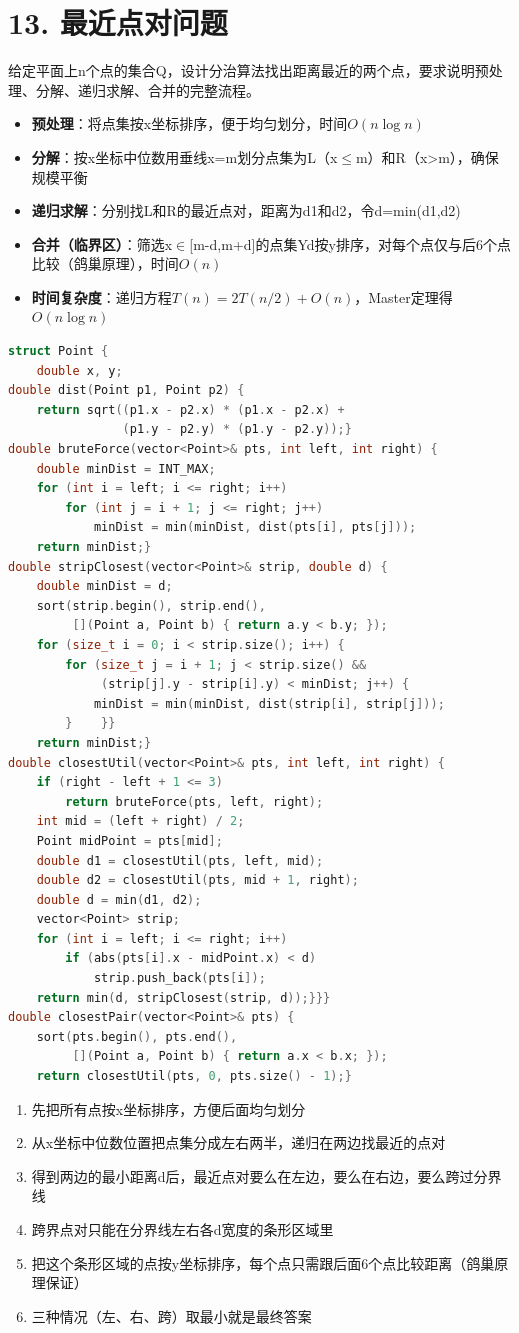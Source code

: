 \section*{13. 最近点对问题}

给定平面上n个点的集合Q，设计分治算法找出距离最近的两个点，要求说明预处理、分解、递归求解、合并的完整流程。

\begin{itemize}
    \item \textbf{预处理}：将点集按x坐标排序，便于均匀划分，时间$O(n\log n)$
    \item \textbf{分解}：按x坐标中位数用垂线x=m划分点集为L（x$\le$m）和R（x>m），确保规模平衡
    \item \textbf{递归求解}：分别找L和R的最近点对，距离为d1和d2，令d=min(d1,d2)
    \item \textbf{合并（临界区）}：筛选x$\in$[m-d,m+d]的点集Yd按y排序，对每个点仅与后6个点比较（鸽巢原理），时间$O(n)$
    \item \textbf{时间复杂度}：递归方程$T(n)=2T(n/2)+O(n)$，Master定理得$O(n\log n)$
\end{itemize}

\begin{lstlisting}[language=C++, style=cppstyle]
struct Point {
    double x, y;
double dist(Point p1, Point p2) {
    return sqrt((p1.x - p2.x) * (p1.x - p2.x) +
                (p1.y - p2.y) * (p1.y - p2.y));}
double bruteForce(vector<Point>& pts, int left, int right) {
    double minDist = INT_MAX;
    for (int i = left; i <= right; i++)
        for (int j = i + 1; j <= right; j++)
            minDist = min(minDist, dist(pts[i], pts[j]));
    return minDist;}
double stripClosest(vector<Point>& strip, double d) {
    double minDist = d;
    sort(strip.begin(), strip.end(),
         [](Point a, Point b) { return a.y < b.y; });
    for (size_t i = 0; i < strip.size(); i++) {
        for (size_t j = i + 1; j < strip.size() &&
             (strip[j].y - strip[i].y) < minDist; j++) {
            minDist = min(minDist, dist(strip[i], strip[j]));
        }    }}
    return minDist;}
double closestUtil(vector<Point>& pts, int left, int right) {
    if (right - left + 1 <= 3)
        return bruteForce(pts, left, right);
    int mid = (left + right) / 2;
    Point midPoint = pts[mid];
    double d1 = closestUtil(pts, left, mid);
    double d2 = closestUtil(pts, mid + 1, right);
    double d = min(d1, d2);
    vector<Point> strip;
    for (int i = left; i <= right; i++)
        if (abs(pts[i].x - midPoint.x) < d)
            strip.push_back(pts[i]);
    return min(d, stripClosest(strip, d));}}}
double closestPair(vector<Point>& pts) {
    sort(pts.begin(), pts.end(),
         [](Point a, Point b) { return a.x < b.x; });
    return closestUtil(pts, 0, pts.size() - 1);}
\end{lstlisting}

\begin{enumerate}
    \item 先把所有点按x坐标排序，方便后面均匀划分
    \item 从x坐标中位数位置把点集分成左右两半，递归在两边找最近的点对
    \item 得到两边的最小距离d后，最近点对要么在左边，要么在右边，要么跨过分界线
    \item 跨界点对只能在分界线左右各d宽度的条形区域里
    \item 把这个条形区域的点按y坐标排序，每个点只需跟后面6个点比较距离（鸽巢原理保证）
    \item 三种情况（左、右、跨）取最小就是最终答案
\end{enumerate}
